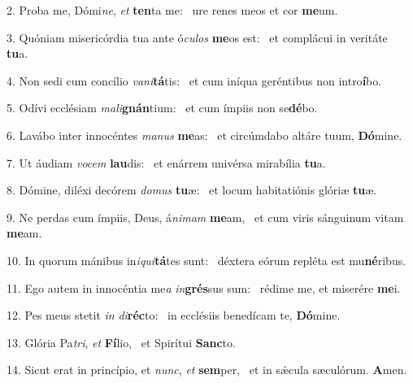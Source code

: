 2. Proba me, Dómi\textit{ne}, \textit{et} \textbf{ten}ta me: \ast\  ure renes meos et cor \textbf{me}um.\

3. Quóniam misericórdia tua ante ó\textit{cu}\textit{los} \textbf{me}os est: \ast\  et complácui in veritáte \textbf{tu}a.\

4. Non sedi cum concílio \textit{va}\textit{ni}\textbf{tá}tis: \ast\  et cum iníqua geréntibus non intro\textbf{í}bo.\

5. Odívi ecclésiam \textit{ma}\textit{li}\textbf{gnán}tium: \ast\  et cum ímpiis non se\textbf{dé}bo.\

6. Lavábo inter innocéntes \textit{ma}\textit{nus} \textbf{me}as: \ast\  et circúmdabo altáre tuum, \textbf{Dó}mine.\

7. Ut áudiam \textit{vo}\textit{cem} \textbf{lau}dis: \ast\  et enárrem univérsa mirabília \textbf{tu}a.\

8. Dómine, diléxi decórem \textit{do}\textit{mus} \textbf{tu}æ: \ast\  et locum habitatiónis glóriæ \textbf{tu}æ.\

9. Ne perdas cum ímpiis, Deus, á\textit{ni}\textit{mam} \textbf{me}am, \ast\  et cum viris sánguinum vitam \textbf{me}am.\

10. In quorum mánibus in\textit{i}\textit{qui}\textbf{tá}tes sunt: \ast\  déxtera eórum repléta est mu\textbf{né}ribus.\

11. Ego autem in innocéntia me\textit{a} \textit{in}\textbf{grés}sus sum: \ast\  rédime me, et miserére \textbf{me}i.\

12. Pes meus stetit \textit{in} \textit{di}\textbf{réc}to: \ast\  in ecclésiis benedícam te, \textbf{Dó}mine.\

13. Glória Pa\textit{tri}, \textit{et} \textbf{Fí}lio, \ast\  et Spirítui \textbf{Sanc}to.\

14. Sicut erat in princípio, et \textit{nunc}, \textit{et} \textbf{sem}per, \ast\  et in sǽcula sæculórum. \textbf{A}men.\

